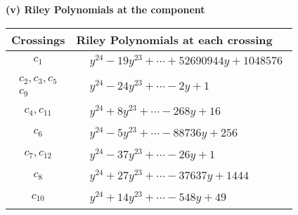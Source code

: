 \documentclass[1p]{elsarticle_modified}
\theoremstyle{definition}
\begin{document}
\newpage\renewcommand{\arraystretch}{1}
\flushleft \textbf{(v) Riley Polynomials at the component}\newline \\
\begin{tabular}{m{50pt}|m{274pt}}
Crossings & \hspace{64pt}Riley Polynomials at each crossing \\
\hline $$\begin{aligned}c_{1}\end{aligned}$$&$\begin{aligned}
&y^{24}-19 y^{23}+\cdots+52690944 y+1048576
\end{aligned}$\\
\hline $$\begin{aligned}c_{2},c_{3},c_{5}\\c_{9}\end{aligned}$$&$\begin{aligned}
&y^{24}-24 y^{23}+\cdots-2 y+1
\end{aligned}$\\
\hline $$\begin{aligned}c_{4},c_{11}\end{aligned}$$&$\begin{aligned}
&y^{24}+8 y^{23}+\cdots-268 y+16
\end{aligned}$\\
\hline $$\begin{aligned}c_{6}\end{aligned}$$&$\begin{aligned}
&y^{24}-5 y^{23}+\cdots-88736 y+256
\end{aligned}$\\
\hline $$\begin{aligned}c_{7},c_{12}\end{aligned}$$&$\begin{aligned}
&y^{24}-37 y^{23}+\cdots-26 y+1
\end{aligned}$\\
\hline $$\begin{aligned}c_{8}\end{aligned}$$&$\begin{aligned}
&y^{24}+27 y^{23}+\cdots-37637 y+1444
\end{aligned}$\\
\hline $$\begin{aligned}c_{10}\end{aligned}$$&$\begin{aligned}
&y^{24}+14 y^{23}+\cdots-548 y+49
\end{aligned}$\\
\hline
\end{tabular}\\~\\
\end{document}
